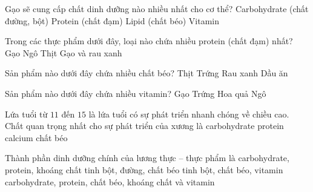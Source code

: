 \documentclass[Main.tex]{subfiles}
\begin{document}
\begin{ex}%
	Gạo sẽ cung cấp chất dinh dưỡng nào nhiều nhất cho cơ thể?
	\choice
	{\True Carbohydrate (chất đường, bột)}
	{Protein (chất đạm)}
	{Lipid (chất béo)}
	{Vitamin}
\end{ex}

\begin{ex}%
	Trong các thực phẩm dưới đây, loại nào chứa nhiều protein (chất đạm) nhất?
	\choice
	{Gạo}
	{Ngô}
	{\True Thịt}
	{Gạo và rau xanh}
\end{ex}

\begin{ex}%
	Sản phẩm nào dưới đây chứa nhiều chất béo?
	\choice
	{Thịt}
	{Trứng}
	{Rau xanh}
	{\True Dầu ăn}
\end{ex}

\begin{ex}%
	Sản phẩm nào dưới đây chứa nhiều vitamin?
	\choice
	{Gạo}
	{Trứng}
	{\True Hoa quả}
	{Ngô}
\end{ex}

\begin{ex}%
	Lứa tuổi từ $11$ đến $15$ là lứa tuổi có sự phát triển nhanh chóng về chiều cao. Chất quan trọng nhất cho sự phát triển của xương là
	\choice
	{carbohydrate}
	{protein}
	{\True calcium}
	{chất béo}
\end{ex}

\begin{ex}%
	Thành phần dinh dưỡng chính của lương thực -- thực phẩm là
	\choice
	{carbohydrate, protein, khoáng chất}
	{tinh bột, đường, chất béo}
	{tinh bột, chất béo, vitamin}
	{\True carbohydrate, protein, chất béo, khoáng chất và vitamin}
\end{ex}
\end{document}
